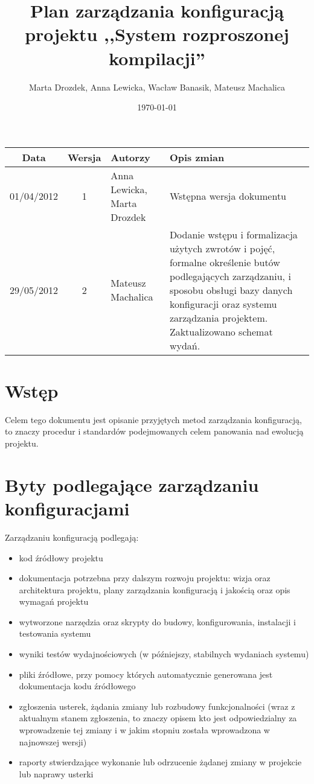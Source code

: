\documentclass[a4paper]{article}
\title{Plan zarządzania konfiguracją projektu ,,System rozproszonej kompilacji''}
\author{Marta Drozdek, Anna Lewicka, Wacław Banasik, Mateusz Machalica}
\date{\today}
\begin{document}
\maketitle

\begin{table}[!h]
	\centering
	\begin{tabular}{|c|c|p{3cm}|p{9cm}|}
		\hline
		\textbf{Data} & \textbf{Wersja} & \textbf{Autorzy} & \textbf{Opis zmian} \\ \hline
		01/04/2012 & 1 & Anna Lewicka, Marta Drozdek & Wstępna wersja dokumentu \\ \hline
		29/05/2012 & 2 & Mateusz Machalica & Dodanie wstępu i formalizacja użytych zwrotów i pojęć, formalne określenie butów podlegających zarządzaniu, i sposobu obsługi bazy danych konfiguracji oraz systemu zarządzania projektem. Zaktualizowano schemat wydań. \\ \hline
	\end{tabular}
\end{table}

\section{Wstęp}

Celem tego dokumentu jest opisanie przyjętych metod zarządzania konfiguracją, to znaczy procedur i standardów podejmowanych celem panowania nad ewolucją projektu.

\section{Byty podlegające zarządzaniu konfiguracjami}

Zarządzaniu konfiguracją podlegają:
\begin{itemize}
	\item kod źródłowy projektu
	\item dokumentacja potrzebna przy dalszym rozwoju projektu: wizja oraz architektura projektu, plany zarządzania konfiguracją i jakością oraz opis wymagań projektu
	\item wytworzone narzędzia oraz skrypty do budowy, konfigurowania, instalacji i testowania systemu
	\item wyniki testów wydajnościowych (w późniejszy, stabilnych wydaniach systemu)
	\item pliki źródłowe, przy pomocy których automatycznie generowana jest dokumentacja kodu źródłowego
	\item zgłoszenia usterek, żądania zmiany lub rozbudowy funkcjonalności (wraz z aktualnym stanem zgłoszenia, to znaczy opisem kto jest odpowiedzialny za wprowadzenie tej zmiany i w jakim stopniu została wprowadzona w najnowszej wersji)
	\item raporty stwierdzające wykonanie lub odrzucenie żądanej zmiany w projekcie lub naprawy usterki
\end{itemize}
\end{document}
